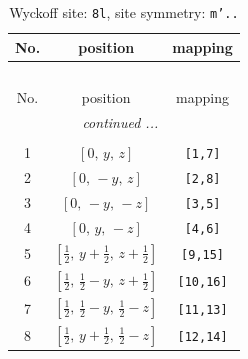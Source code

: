 \documentclass[fleqn,8pt]{jsarticle}
\begin{document}
\begin{longtable}{ccc}
\caption{Wyckoff site: {\tt 8l}, site symmetry: {\tt m'..}}
 \\
 \hline \hline
No. & position & mapping \\ \hline \endfirsthead

\multicolumn{2}{l}{\tablename\ \thetable{}} \\
 \hline \hline
No. & position & mapping \\ \hline \endhead

 \hline \hline
\multicolumn{2}{r}{\footnotesize\it continued ...} \\ \endfoot

 \hline \hline
\multicolumn{2}{r}{} \\ \endlastfoot

1 & $\left[ 0,\, y,\, z \right]$ & {\tt [1,7]} \\ \hline
2 & $\left[ 0,\, - y,\, z \right]$ & {\tt [2,8]} \\ \hline
3 & $\left[ 0,\, - y,\, - z \right]$ & {\tt [3,5]} \\ \hline
4 & $\left[ 0,\, y,\, - z \right]$ & {\tt [4,6]} \\ \hline
5 & $\left[ \frac{1}{2},\, y + \frac{1}{2},\, z + \frac{1}{2} \right]$ & {\tt [9,15]} \\ \hline
6 & $\left[ \frac{1}{2},\, \frac{1}{2} - y,\, z + \frac{1}{2} \right]$ & {\tt [10,16]} \\ \hline
7 & $\left[ \frac{1}{2},\, \frac{1}{2} - y,\, \frac{1}{2} - z \right]$ & {\tt [11,13]} \\ \hline
8 & $\left[ \frac{1}{2},\, y + \frac{1}{2},\, \frac{1}{2} - z \right]$ & {\tt [12,14]} \\
\end{longtable}
\renewcommand{\arraystretch}{1.2}
\end{document}
